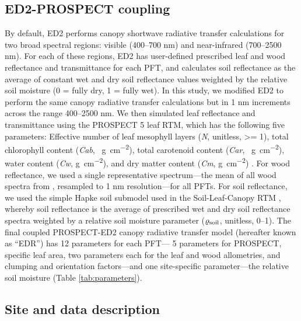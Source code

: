 \subsection{ED2-PROSPECT coupling}

By default, ED2 performs canopy shortwave radiative transfer calculations for two broad spectral regions: visible (400--700 \unit{nm}) and near-infrared (700--2500 \unit{nm}).
For each of these regions, ED2 has user-defined prescribed leaf and wood reflectance and transmittance for each PFT, and calculates soil reflectance as the average of constant wet and dry soil reflectance values weighted by the relative soil moisture (0 = fully dry, 1 = fully wet).
In this study, we modified ED2 to perform the same canopy radiative transfer calculations but in 1 \unit{nm} increments across the range 400--2500 \unit{nm}.
We then simulated leaf reflectance and transmittance using the PROSPECT 5 leaf RTM,
which has the following five parameters:
Effective number of leaf mesophyll layers (\emph{N}, unitless, >= 1),
total chlorophyll content (\emph{Cab}, \unit{\mu g ~ cm^{-2}}),
total carotenoid content (\emph{Car}, \unit{\mu g ~ cm^{-2}}),
water content (\emph{Cw}, \unit{g ~ cm^{-2}}),
and dry matter content (\emph{Cm}, \unit{g ~ cm^{-2}})
\citep{feret2008prospect4}.
For wood reflectance, we used a single representative spectrum---the mean of all wood spectra from \citet{asner1998biophysical}, resampled to 1 \unit{nm} resolution---for all PFTs.
For soil reflectance, we used the simple Hapke soil submodel used in the Soil-Leaf-Canopy RTM \citep{verhoef2007coupled}, whereby soil reflectance is the average of prescribed wet and dry soil reflectance spectra weighted by a relative soil moisture parameter ($\varrho_{\mathrm{soil}}$, unitless, 0--1).
The final coupled PROSPECT-ED2 canopy radiative transfer model (hereafter known as ``EDR'') has 12 parameters for each PFT---
5 parameters for PROSPECT, specific leaf area, two parameters each for the leaf and wood allometries, and clumping and orientation factors---and one site-specific parameter---the relative soil moisture (Table \ref{tab:parameters}).

\subsection{Site and data description}\label{subsec:site-data}

